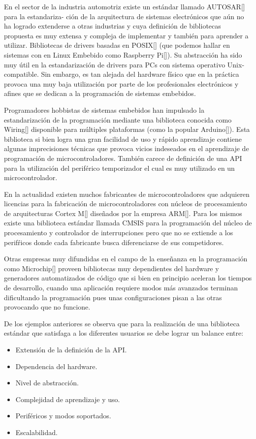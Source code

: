 En el sector de la industria automotriz existe un estándar llamado AUTOSAR[] para la estandariza- ción de la  arquitectura de sistemas electrónicos que aún no ha logrado extenderse a otras industrias y cuya definición de bibliotecas propuesta es muy extensa y compleja de implementar y también para aprender a utilizar.
Bibliotecas de drivers basadas en POSIX[] (que podemos hallar en sistemas con en Linux Embebido como Raspberry Pi[]). Su abstracción ha sido muy útil en la estandarización de drivers para PCs con sistema operativo Unix-compatible. Sin embargo, es tan alejada del hardware físico que en la práctica provoca una muy baja utilización por parte de los profesionales electrónicos y afines que se dedican a la programación de sistemas embebidos.

Programadores hobbistas de sistemas embebidos han impulsado la  estandarización de la programación mediante una biblioteca conocida como Wiring[] disponible para múltiples plataformas (como la popular Arduino[]). Esta biblioteca si bien logra una gran facilidad de uso y rápido aprendizaje contiene algunas imprecisiones técnicas que provoca vicios indeseados en el aprendizaje de programación de microcontroladores. También carece de definición de una API para la utilización del periférico temporizador el cual es muy utilizado en un microcontrolador.

En la actualidad existen muchos fabricantes de microcontroladores que adquieren licencias para la fabricación de microcontroladores con núcleos de procesamiento de arquitecturas Cortex M[] diseñados por la empresa ARM[]. Para los mismos existe una biblioteca estándar llamada CMSIS{} para la programación del núcleo de procesamiento y controlador de interrupciones pero que no se extiende a los perifŕicos donde cada fabricante busca diferenciarse de sus competidores.

Otras empresas muy difundidas en el campo de la enseñanza en la programación como Microchip[] proveen bibliotecas muy dependientes del hardware y generadores automatizados de código que si bien en principio aceleran los tiempos de desarrollo, cuando una aplicación requiere modos más avanzados terminan dificultando la programación pues unas configuraciones pisan a las otras provocando que no funcione.

De los ejemplos anteriores se observa que para la realización de una biblioteca estándar que satisfaga a los diferentes usuarios se debe lograr un balance entre:

\begin{itemize}
\item Extensión de la definición de la API.
\item Dependencia del hardware.
\item Nivel de abstracción.
\item Complejidad de aprendizaje y uso.
\item Periféricos y modos soportados.
\item Escalabilidad.
\end{itemize}





